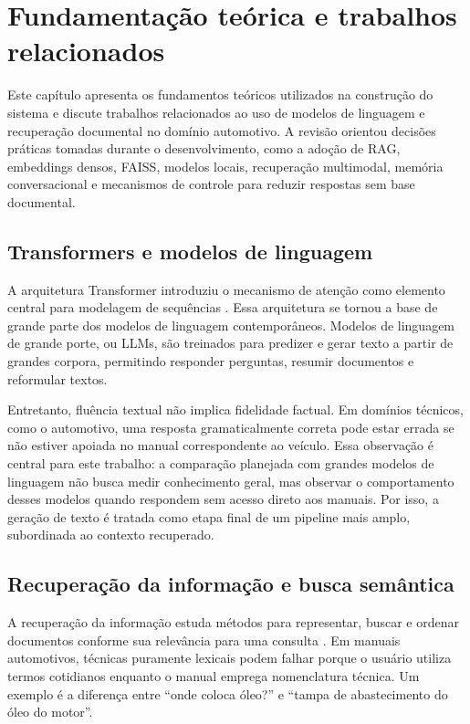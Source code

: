 \chapter{Fundamentação teórica e trabalhos relacionados}
\label{cap:revisao}

Este capítulo apresenta os fundamentos teóricos utilizados na construção do sistema e discute trabalhos relacionados ao uso de modelos de linguagem e recuperação documental no domínio automotivo. A revisão orientou decisões práticas tomadas durante o desenvolvimento, como a adoção de RAG, embeddings densos, FAISS, modelos locais, recuperação multimodal, memória conversacional e mecanismos de controle para reduzir respostas sem base documental.

\section{Transformers e modelos de linguagem}

A arquitetura Transformer introduziu o mecanismo de atenção como elemento central para modelagem de sequências \cite{vaswani2017attention}. Essa arquitetura se tornou a base de grande parte dos modelos de linguagem contemporâneos. Modelos de linguagem de grande porte, ou \acf{LLM}s, são treinados para predizer e gerar texto a partir de grandes corpora, permitindo responder perguntas, resumir documentos e reformular textos.

Entretanto, fluência textual não implica fidelidade factual. Em domínios técnicos, como o automotivo, uma resposta gramaticalmente correta pode estar errada se não estiver apoiada no manual correspondente ao veículo. Essa observação é central para este trabalho: a comparação planejada com grandes modelos de linguagem não busca medir conhecimento geral, mas observar o comportamento desses modelos quando respondem sem acesso direto aos manuais. Por isso, a geração de texto é tratada como etapa final de um pipeline mais amplo, subordinada ao contexto recuperado.

\section{Recuperação da informação e busca semântica}

A recuperação da informação estuda métodos para representar, buscar e ordenar documentos conforme sua relevância para uma consulta \cite{manning2008information}. Em manuais automotivos, técnicas puramente lexicais podem falhar porque o usuário utiliza termos cotidianos enquanto o manual emprega nomenclatura técnica. Um exemplo é a diferença entre ``onde coloca óleo?'' e ``tampa de abastecimento do óleo do motor''.

